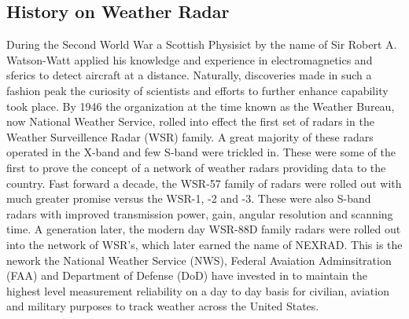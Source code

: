 \documentclass[conference]{IEEEtran}
\begin{document}
\subsection{History on Weather Radar}
During the Second World War a Scottish Physisict by the name of Sir Robert A. Watson-Watt applied his knowledge and experience in electromagnetics and sferics to detect aircraft at a distance\cite{history}. Naturally, discoveries made in such a fashion peak the curiosity of scientists and efforts to further enhance capability took place. By 1946 the organization at the time known as the Weather Bureau, now National Weather Service, rolled into effect the first set of radars in the Weather Surveillence Radar (WSR) family\cite{history}. A great majority of these radars operated in the X-band and few S-band were trickled in. These were some of the first to prove the concept of a network of weather radars providing data to the country. Fast forward a decade, the WSR-57 family of radars were rolled out with much greater promise versus the WSR-1, -2 and -3. These were also S-band radars with improved transmission power, gain, angular resolution and scanning time. A generation later, the modern day WSR-88D family radars were rolled out into the network of WSR's, which later earned the name of NEXRAD. This is the nework the National Weather Service (NWS), Federal Avaiation Adminsitration (FAA) and Department of Defense (DoD) have invested in to maintain the highest level measurement reliability on a day to day basis for civilian, aviation and military purposes to track weather across the United States\cite{history}. 
\end{document}

